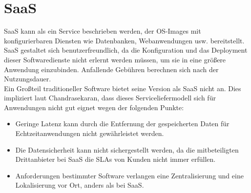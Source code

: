 \documentclass[
12pt,
english,
ngerman,
headsepline,
twoside,
openright,
numbers=noenddot,version=first
]{scrreprt}
\begin{document}
\section{SaaS} 
\label{sec:saas}
\acrfull{SaaS} kann als ein Service beschrieben werden, der OS-Images mit konfigurierbaren Diensten wie Datenbanken, Webanwendungen usw. bereitstellt. \acrshort{SaaS} gestaltet sich benutzerfreundlich, da die Konfiguration und das Deployment dieser Softwaredienste nicht erlernt werden müssen, um sie in eine größere Anwendung einzubinden. Anfallende Gebühren berechnen sich nach der Nutzungsdauer.\\
Ein Großteil traditioneller Software bietet seine Version als \acrshort{SaaS} nicht an. Dies impliziert laut Chandrasekaran, dass dieses Serviceliefermodell sich für Anwendungen nicht gut eignet wegen der folgenden Punkte:
\begin{itemize}
	\item Geringe Latenz kann durch die Entfernung der gespeicherten Daten für Echtzeitanwendungen nicht gewährleistet werden.
	\item Die Datensicherheit kann nicht sichergestellt werden, da die mitbeteiligten Drittanbieter bei \acrshort{SaaS} die \acrfull{SLA}s von Kunden nicht immer erfüllen.
	\item Anforderungen bestimmter Software verlangen eine Zentralisierung und eine Lokalisierung vor Ort, anders als bei \acrshort{SaaS}. 
\end{itemize}\cite{cloudEssentials}



\end{document}
